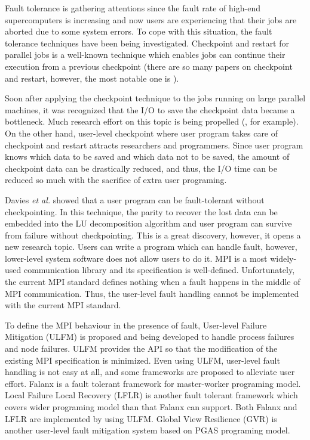 \documentclass[10pt,conference,a4paper,fleqn]{IEEEtran}
\begin{document}
Fault tolerance is gathering attentions since the fault rate of
high-end supercomputers is increasing\cite{techrep10040} and
now users are experiencing that their jobs are aborted due to some
system errors\cite{6903615}. To cope with this situation, the fault
tolerance techniques have been being investigated. Checkpoint and
restart for parallel jobs is a well-known technique which enables jobs
can continue their execution from a previous checkpoint (there are so
many papers on checkpoint and restart, however, the most notable one
is \cite{CLIP}).  

Soon after applying the checkpoint technique to the jobs running on
large parallel machines, it was recognized that the I/O to save the 
checkpoint data became a bottleneck. Much research effort on this
topic is being propelled (\cite{Sato:2012:DMN:2388996.2389022}, for
example). On the other hand, user-level checkpoint where user
program takes care of checkpoint and restart attracts
researchers and programmers. Since user program knows  
which data to be saved and which data not to be saved, the amount of
checkpoint data can be drastically reduced, and thus, the I/O time can
be reduced so much with the sacrifice of extra user programing. 

Davies {\it et al.} showed that a user program can be fault-tolerant
without checkpointing\cite{Davies:2011:HPL:1995896.1995923}. In this
technique, the parity to recover the lost data can be embedded into the
LU decomposition algorithm and user program can survive from failure
without checkpointing. This is a great discovery, however, it
opens a new research topic. Users can write a program which can handle
fault, however, lower-level system software does not allow users to do
it. MPI is a most widely-used communication library and its
specification is well-defined\cite{mpi-v3}. Unfortunately, the current
MPI standard defines nothing when a fault happens in the middle of MPI 
communication. Thus, the user-level fault handling cannot be
implemented with the current MPI standard.

To define the MPI behaviour in the presence of fault, User-level
Failure Mitigation (ULFM) is proposed and being developed to handle
process failures and node failures\cite{Bland01082013}. ULFM provides
the API so that the modification of the existing MPI specification is 
minimized. Even using ULFM, user-level fault handling is not easy at
all, and some frameworks are proposed to alleviate user effort.
Falanx is a fault tolerant framework for master-worker programing
model. Local Failure Local Recovery (LFLR) is another fault tolerant
framework\cite{Teranishi:2014:TLF:2642769.2642774} which covers wider 
programing model than that Falanx can support. Both Falanx and LFLR
are implemented by using ULFM. Global View Resilience (GVR) is another
user-level fault mitigation system based on PGAS programing
model\cite{gvr-sc14,GVR-vecpar2014}.
\end{document}
